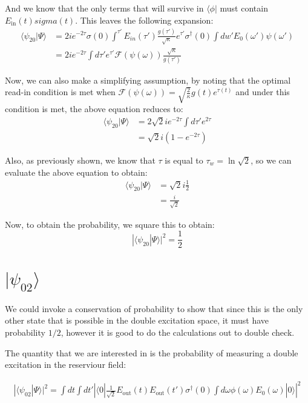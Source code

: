 \documentclass[12pt]{article}
\begin{document}
And we know that the only terms that will survive in $\langle \phi |$ must contain $E_\textrm{in}(t) sigma(t)$. This leaves the following expansion:
\begin{align}
\langle \psi_{20}| \Psi \rangle &= 2 i e^{-2\tau} \sigma(0) 
\int^{\tau'} E_{in}(\tau') \frac{g(\tau')}{\sqrt{\kappa}} e^{\tau'} \sigma^\dagger(0) \int dw' E_0(\omega') \psi(\omega')\\ 
&= 2 i e^{-2 \tau} \int d \tau' e^{\tau'} 
 \mathscr{F}(\psi(\omega)) \frac{\sqrt{\kappa}}{g(\tau')}
\end{align}

Now, we can also make a simplifying assumption, by noting that the optimal read-in condition is met when $\mathscr{F}(\psi(\omega)) = \sqrt{\frac{2}{\kappa}} g(t) e^{\tau(t)}$ and under this condition is met, the above equation reduces to:
\begin{align}
\langle \psi_{20}| \Psi \rangle & = 2\sqrt{2} i e^{-2\tau} \int d \tau' e^{2 \tau} \\
& = \sqrt{2} i\left(1- e^{-2\tau}\right)
\end{align}

Also, as previously shown, we know that $\tau$ is equal to $\tau_w = \ln{\sqrt{2}}$, so we can evaluate the above equation to obtain:
\begin{align}
\langle \psi_{20}| \Psi \rangle &= \sqrt{2} i \frac{1}{2} \\
&= \frac{i}{\sqrt{2}}
\end{align}

Now, to obtain the probability, we square this to obtain:
\begin{equation}
| \langle \psi_{20}| \Psi \rangle | ^2 = \frac{1}{2}
\end{equation}
\section{$| \psi_{02} \rangle $}

We could invoke a conservation of probability to show that since this is the only other state that is possible in the double excitation space, it must have probability $1/2$, however it is good to do the calculations out to double check.

The quantity that we are interested in is the probability of measuring a double excitation in the reserviour field:

\begin{align}
|\langle \psi_{02} | \Psi \rangle |^2 =\int dt \int dt' \left | \langle 0 |\frac{1}{\sqrt{2}} E_\textrm{out}(t) E_\textrm{out}(t') \sigma^\dagger(0) \int d \omega \phi(\omega) E_0(\omega) | 0 \rangle \right |^2
\end{align}
\end{document}
